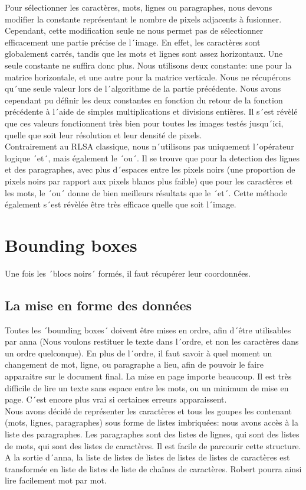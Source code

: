Pour sélectionner les caractères, mots, lignes ou paragraphes, nous devons modifier la constante représentant le nombre de pixels adjacents à fusionner. Cependant, cette modification seule ne nous permet pas de sélectionner efficacement une partie précise de l´image. En effet, les caractères sont globalement carrés, tandis que les mots et lignes sont assez horizontaux. Une seule constante ne suffira donc plus. Nous utilisons deux constante: une pour la matrice horizontale, et une autre pour la matrice verticale. Nous ne récupérons qu´une seule valeur lors de l´algorithme de la partie précédente. Nous avons cependant pu définir les deux constantes en fonction du retour de la fonction précédente à l´aide de simples multiplications et divisions entières. Il s´est révèlé que ces valeurs fonctionnent très bien pour toutes les images testés jusqu´ici, quelle que soit leur résolution et leur densité de pixels.\\
Contrairement au RLSA classique, nous n´utilisons pas uniquement l´opérateur logique ´et´, mais également le ´ou´. Il se trouve que pour la detection des lignes et des paragraphes, avec plus d´espaces entre les pixels noirs (une proportion de pixels noirs par rapport aux pixels blancs plus faible) que pour les caractères et les mots, le ´ou´ donne de bien meilleurs résultats que le ´et´. Cette méthode également s´est révèlée être très efficace quelle que soit l´image.


\section{Bounding boxes}

Une fois les ´blocs noirs´ formés, il faut récupérer leur coordonnées.  


\subsection{La mise en forme des données}

Toutes les ´bounding boxes´ doivent être mises en ordre, afin d´être utilisables par anna (Nous voulons restituer le texte dans l´ordre, et non les caractères dans un ordre quelconque). En plus de l´ordre, il faut savoir à quel moment un changement de mot, ligne, ou paragraphe a lieu, afin de pouvoir le faire apparaitre sur le document final. La mise en page importe beaucoup. Il est très difficile de lire un texte sans espace entre les mots, ou un minimum de mise en page. C´est encore plus vrai si certaines erreurs apparaissent.\\
Nous avons décidé de représenter les caractères et tous les goupes les contenant (mots, lignes, paragraphes) sous forme de listes imbriquées: nous avons accès à la liste des paragraphes. Les paragraphes sont des listes de lignes, qui sont des listes de mots, qui sont des listes de caractères. Il est facile de parcourir cette structure. A la sortie d´anna, la liste de listes de listes de listes de listes de caractères est transformée en liste de listes de liste de chaînes de caractères. Robert pourra ainsi lire facilement mot par mot.



